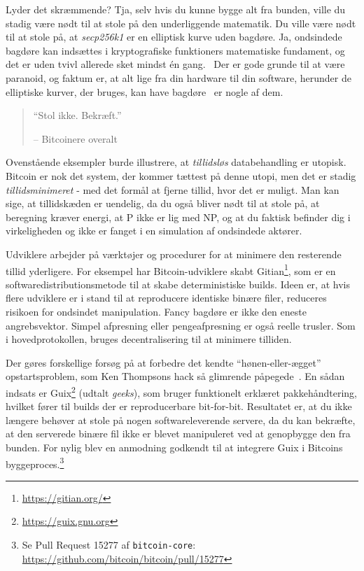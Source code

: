 \documentclass[paper=6in:9in,pagesize=pdftex,headinclude=on,footinclude=on,12pt]{scrbook}
\begin{document}
Lyder det skræmmende? Tja, selv hvis du kunne bygge alt fra bunden, ville du stadig være nødt til at stole på den underliggende matematik. Du ville være nødt til at stole på, at \textit{secp256k1} er en elliptisk kurve uden bagdøre. Ja, ondsindede bagdøre kan indsættes i kryptografiske funktioners matematiske fundament, og det er uden tvivl allerede sket mindst \'en gang.~\cite{wiki:Dual_EC_DRBG} Der er gode grunde til at være paranoid, og faktum er, at alt lige fra din hardware til din software, herunder de elliptiske kurver, der bruges, kan have bagdøre~\cite{wiki:backdoors} er nogle af dem.\begin{quotation}\begin{samepage} \enquote{Stol ikke. Bekræft.} \begin{flushright} -- Bitcoinere overalt \end{flushright}\end{samepage}\end{quotation}

Ovenstående eksempler burde illustrere, at \textit{tillidsløs} databehandling er utopisk. Bitcoin er nok det system, der kommer tættest på denne utopi, men det er stadig \textit{tillidsminimeret} - med det formål at fjerne tillid, hvor det er muligt. Man kan sige, at tillidskæden er uendelig, da du også bliver nødt til at stole på, at beregning kræver energi, at P ikke er lig med NP, og at du faktisk befinder dig i virkeligheden og ikke er fanget i en simulation af ondsindede aktører.

Udviklere arbejder på værktøjer og procedurer for at minimere den resterende tillid yderligere. For eksempel har Bitcoin-udviklere skabt Gitian\footnote{\url{https://gitian.org/}}, som er en softwaredistributionsmetode til at skabe deterministiske builds. Ideen er, at hvis flere udviklere er i stand til at reproducere identiske binære filer, reduceres risikoen for ondsindet manipulation. Fancy bagdøre er ikke den eneste angrebsvektor. Simpel afpresning eller pengeafpresning er også reelle trusler. Som i hovedprotokollen, bruges decentralisering til at minimere tilliden.

Der gøres forskellige forsøg på at forbedre det kendte \enquote{hønen-eller-ægget} opstartsproblem, som Ken Thompsons hack så glimrende påpegede~\cite{web:bootstrapping}. En sådan indsats er Guix\footnote{\url{https://guix.gnu.org}} (udtalt \textit{geeks}), som bruger funktionelt erklæret pakkehåndtering, hvilket fører til builds der er reproducerbare bit-for-bit. Resultatet er, at du ikke længere behøver at stole på nogen softwareleverende servere, da du kan bekræfte, at den serverede binære fil ikke er blevet manipuleret ved at genopbygge den fra bunden. For nylig blev en anmodning godkendt til at integrere Guix i Bitcoins byggeproces.\footnote{Se Pull Request 15277 af \texttt{bitcoin-core}: \\ \url{https://github.com/bitcoin/bitcoin/pull/15277}}
\end{document}
